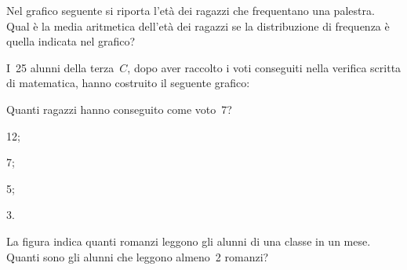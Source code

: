 \begin{esercizio}
\label{ese:A.55}
Nel grafico seguente si riporta l'età dei ragazzi che frequentano una 
palestra. Qual è la media aritmetica dell'età dei ragazzi
se la distribuzione di frequenza è quella indicata nel grafico?
\begin{center}
 
\end{center}
\end{esercizio}
\begin{esercizio}
\label{ese:A.56}
I~25 alunni della terza~$C$, dopo aver raccolto i voti conseguiti
nella verifica scritta di matematica, hanno costruito il seguente grafico:
\begin{center}
 
\end{center}
Quanti ragazzi hanno conseguito come voto~7?
\begin{multicols}{4}
 \begin{enumeratea}
 \item 12;
 \item 7;
 \item 5;
 \item 3.
\end{enumeratea}
\end{multicols}
\end{esercizio}

\begin{esercizio}
\label{ese:A.57}
La figura indica quanti romanzi leggono gli alunni di una classe in un 
mese. Quanti sono gli alunni che leggono almeno~2 romanzi?
\begin{center}
 
\end{center}
\end{esercizio}

